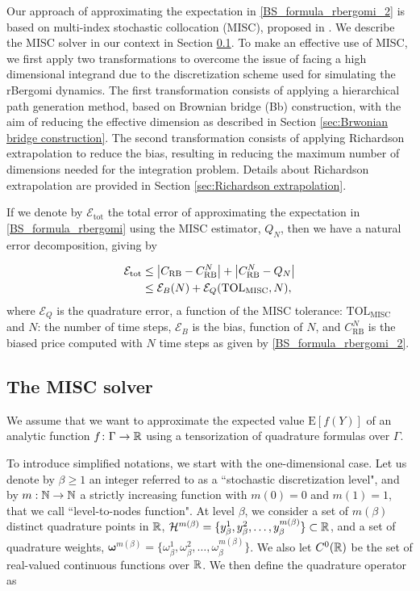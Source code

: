 Our approach of approximating the expectation in \eqref{BS_formula_rbergomi_2} is based on multi-index stochastic collocation (MISC), proposed in \cite{haji2016multi}. We describe the  MISC solver in our context in Section \ref{sec:Details of the MISC}.  To make an effective use of MISC, we  first apply two transformations to overcome the issue of facing a high dimensional integrand due to the discretization scheme used for simulating the rBergomi dynamics. The first transformation consists of applying a hierarchical  path generation method, based on Brownian
bridge (Bb) construction, with the aim of reducing the effective dimension as  described  in Section \ref{sec:Brwonian bridge construction}. The second transformation consists of applying Richardson extrapolation to reduce the bias, resulting in reducing  the maximum number of dimensions needed for the integration problem. Details about  Richardson extrapolation  are provided in Section \ref{sec:Richardson extrapolation}.




If we denote by $\mathcal{E}_{\text{tot}}$ the total error of approximating the  expectation in \eqref{BS_formula_rbergomi} using the MISC estimator, $Q_N$, then we have a natural error decomposition, giving by
 
\begin{align}\label{eq:total_error}
\mathcal{E}_{\text{tot}} & \le \left\lvert C_{\text{RB}}-C_{\text{RB}}^N\right\rvert+\left\lvert C_{\text{RB}}^N-Q_{N}\right\rvert\nonumber\\
  & \le \mathcal{E}_B(N)+ \mathcal{E}_Q(\text{TOL}_{\text{MISC}},N),
\end{align}
where  $\mathcal{E}_Q$ is the quadrature error, a function of the MISC tolerance:  $\text{TOL}_{\text{MISC}}$ and $N$: the number of time steps, $\mathcal{E}_B$  is the bias, function of $N$, and $C_{\text{RB}}^N$ is the biased price computed with $N$ time steps as given by \eqref{BS_formula_rbergomi_2}.

\subsection{The MISC solver}\label{sec:Details of the MISC}

We assume that we want to approximate the expected value $\text{E}[f(Y)]$ of an analytic function $f\colon \Gamma \to \mathbb{R}$ using a tensorization of quadrature formulas over $\Gamma$.

To introduce simplified notations, we start with the one-dimensional case. Let us denote by $\beta \geq 1$ an integer referred to as a ``stochastic discretization level", and by $m: \mathbb{N} \rightarrow \mathbb{N}$  a strictly increasing function with $m(0)=0$ and $m(1)=1$, that we call  ``level-to-nodes function". At level $\beta$, we consider a set of $m(\beta)$ distinct quadrature points in $\mathbb{R}$, $\mathcal{H}^{m(\beta)}=\{y^1_\beta,y^2_\beta,\dots,y_\beta^{m(\beta)}\} \subset \mathbb{R}$, and a set of quadrature weights, $\boldsymbol{\omega}^{m(\beta)}=\{\omega^1_\beta,\omega^2_\beta,\dots,\omega_\beta^{m(\beta)}\}$. We also let $C^0(\mathbb{R})$ be the set of real-valued continuous functions over $\mathbb{R}$. We then define the quadrature operator as


